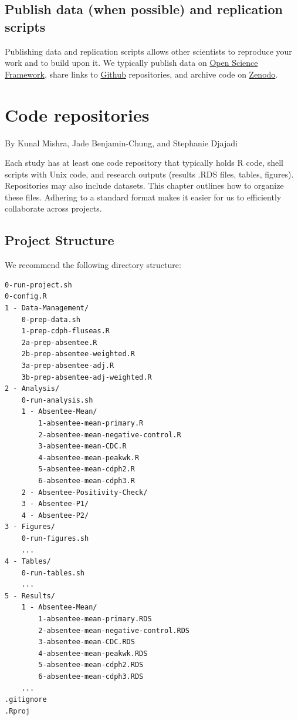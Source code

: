\documentclass[
]{book}
\begin{document}
\section{Publish data (when possible) and replication scripts}\label{publish-data-when-possible-and-replication-scripts}

Publishing data and replication scripts allows other scientists to reproduce your work and to build upon it. We typically publish data on \href{osf.io}{Open Science Framework}, share links to \href{github.com}{Github} repositories, and archive code on \href{zenodo.org}{Zenodo}.

\chapter{Code repositories}\label{code-repositories}

By Kunal Mishra, Jade Benjamin-Chung, and Stephanie Djajadi

Each study has at least one code repository that typically holds R code, shell scripts with Unix code, and research outputs (results .RDS files, tables, figures). Repositories may also include datasets. This chapter outlines how to organize these files. Adhering to a standard format makes it easier for us to efficiently collaborate across projects.

\section{Project Structure}\label{project-structure}

We recommend the following directory structure:

\begin{verbatim}
0-run-project.sh
0-config.R
1 - Data-Management/
    0-prep-data.sh
    1-prep-cdph-fluseas.R
    2a-prep-absentee.R
    2b-prep-absentee-weighted.R
    3a-prep-absentee-adj.R
    3b-prep-absentee-adj-weighted.R
2 - Analysis/
    0-run-analysis.sh
    1 - Absentee-Mean/
        1-absentee-mean-primary.R
        2-absentee-mean-negative-control.R
        3-absentee-mean-CDC.R
        4-absentee-mean-peakwk.R
        5-absentee-mean-cdph2.R
        6-absentee-mean-cdph3.R
    2 - Absentee-Positivity-Check/
    3 - Absentee-P1/
    4 - Absentee-P2/
3 - Figures/
    0-run-figures.sh
    ...
4 - Tables/
    0-run-tables.sh
    ...
5 - Results/
    1 - Absentee-Mean/
        1-absentee-mean-primary.RDS
        2-absentee-mean-negative-control.RDS
        3-absentee-mean-CDC.RDS
        4-absentee-mean-peakwk.RDS
        5-absentee-mean-cdph2.RDS
        6-absentee-mean-cdph3.RDS
    ...
.gitignore
.Rproj
\end{verbatim}
\end{document}
